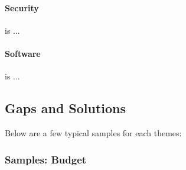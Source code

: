 \paragraph{Security} is ...


\paragraph{Software} is ...

\subsection{Gaps and Solutions}



Below are a few typical samples for each themes:

\subsubsection{Samples: Budget}




